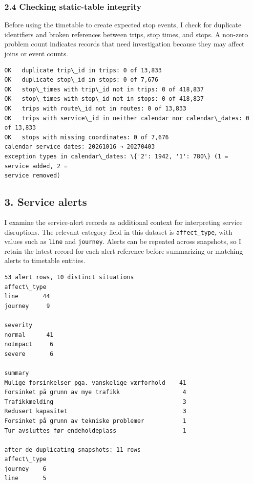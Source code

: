 \documentclass[11pt]{article}
\begin{document}
    \subsubsection{2.4 Checking static-table
integrity}\label{checking-static-table-integrity}

Before using the timetable to create expected stop events, I check for
duplicate identifiers and broken references between trips, stop times,
and stops. A non-zero problem count indicates records that need
investigation because they may affect joins or event counts.

    \begin{Verbatim}[commandchars=\\\{\}]
OK   duplicate trip\_id in trips: 0 of 13,833
OK   duplicate stop\_id in stops: 0 of 7,676
OK   stop\_times with trip\_id not in trips: 0 of 418,837
OK   stop\_times with stop\_id not in stops: 0 of 418,837
OK   trips with route\_id not in routes: 0 of 13,833
OK   trips with service\_id in neither calendar nor calendar\_dates: 0 of 13,833
OK   stops with missing coordinates: 0 of 7,676
calendar service dates: 20261016 → 20270403
exception types in calendar\_dates: \{'2': 1942, '1': 780\} (1 = service added, 2 =
service removed)
    \end{Verbatim}

    \subsection{3. Service alerts}\label{service-alerts}

I examine the service-alert records as additional context for
interpreting service disruptions. The relevant category field in this
dataset is \texttt{affect\_type}, with values such as \texttt{line} and
\texttt{journey}. Alerts can be repeated across snapshots, so I retain
the latest record for each alert reference before summarizing or
matching alerts to timetable entities.

    \begin{Verbatim}[commandchars=\\\{\}]
53 alert rows, 10 distinct situations
affect\_type
line       44
journey     9

severity
normal      41
noImpact     6
severe       6

summary
Mulige forsinkelser pga. vanskelige værforhold    41
Forsinket på grunn av mye trafikk                  4
Trafikkmelding                                     3
Redusert kapasitet                                 3
Forsinket på grunn av tekniske problemer           1
Tur avsluttes før endeholdeplass                   1

after de-duplicating snapshots: 11 rows
affect\_type
journey    6
line       5

    \end{Verbatim}
\end{document}
